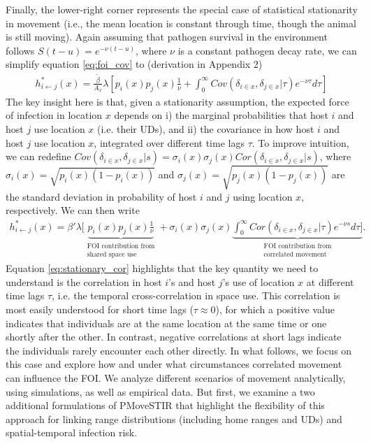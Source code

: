 \documentclass[letterpaper]{article}
\begin{document}
Finally, the lower-right corner represents the special case of statistical stationarity in movement (i.e., the mean location is constant through time, though the animal is still moving).
Again assuming that pathogen survival in the environment follows $S(t - u) = e^{-\nu (t - u)}$, where $\nu$ is a constant pathogen decay rate,  we can simplify equation \ref{eq:foi_cov} to (derivation in Appendix 2)
\begin{equation}
    \begin{aligned}
   h^*_{i \leftarrow j}(x) = \frac{\tilde{\beta}}{A_x} \lambda \left[p_i(x)p_j(x) \frac{1}{\nu} + \int_{0}^{\infty} Cov(\delta_{i \in x}, \delta_{j \in x} | \tau) e^{-\nu \tau} d\tau\right]
    \end{aligned}
    \label{eq:foi_stationary}
\end{equation}
The key insight here is that, given a stationarity assumption, the expected force of infection in location $x$ depends on i) the marginal probabilities that host $i$ and host $j$ use location $x$ (i.e. their UDs),  and ii) the covariance in how host $i$ and host $j$ use location $x$, integrated over different time lags $\tau$. 
To improve intuition, we can redefine $Cov(\delta_{i \in x}, \delta_{j \in x} | s) = \sigma_i(x) \sigma_j(x) Cor(\delta_{i \in x}, \delta_{j \in x} | s)$, where $\sigma_i(x) = \sqrt{p_i(x)(1 - p_i(x))}$  and $\sigma_j(x) = \sqrt{p_j(x)(1 - p_j(x))}$ are the standard deviation in probability of host $i$ and $j$ using location $x$, respectively.  We can then write
\begin{equation}
    \begin{aligned}
    h^*_{i \leftarrow j}(x) = \beta' \lambda [ \underbrace{p_i(x)p_j(x) \frac{1}{\nu}}_{\substack{\text{FOI contribution from} \\ \text{shared space use}}} + \sigma_i(x) \sigma_j(x) \underbrace{\int_{0}^{\infty} Cor(\delta_{i \in x}, \delta_{j \in x} | \tau) e^{-\nu s} d\tau]}_{\substack{\text{FOI contribution from} \\ \text{correlated movement}}}.
    \end{aligned}
    \label{eq:stationary_cor}
\end{equation}
Equation \ref{eq:stationary_cor} highlights that the key quantity we need to understand is the correlation in host $i$'s and host $j$'s use of location $x$ at different time lags $\tau$, i.e. the temporal cross-correlation in space use.
This correlation is most easily understood for short time lags ($\tau\approx0$), for which a positive value indicates that individuals are at the same location at the same time or one shortly after the other. In contrast, negative correlations at short lags indicate the individuals rarely encounter each other directly.
In what follows, we focus on this case and explore how and under what circumstances correlated movement can influence the FOI. We analyze different scenarios of movement analytically, using simulations, as well as empirical data.  But first, we examine a two additional formulations of PMoveSTIR that highlight the flexibility of this approach for linking range distributions (including home ranges and UDs) and spatial-temporal infection risk.
\end{document}
